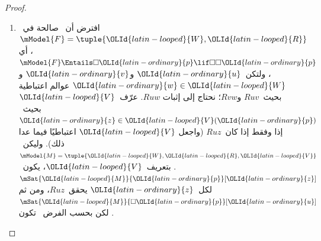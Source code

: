 \documentclass[../../../include/open-logic-section]{subfiles}
\begin{document}
\begin{proof}
\begin{enumerate}
    $\mModel{F}= \tuple{{\OLId{latin-looped}{W}}, {\OLId{latin-looped}{R}}}$. فإذا كان~$\mModel{F}$ غير متناظر،
    وُجد~${\OLId{latin-ordinary}{u}}$ و${\OLId{latin-ordinary}{v}} \in {\OLId{latin-looped}{W}}$ بحيث~$Ruv$ لكن ليس~$Rvu$. عرّف~${\OLId{latin-looped}{V}}$ بحيث
    ${\OLId{latin-ordinary}{w}} \in {\OLId{latin-looped}{V}}({\OLId{latin-ordinary}{p}})$ إذا وفقط إذا لم يكن~$Rvw$ (واجعل~${\OLId{latin-looped}{V}}$ اعتباطيًا فيما
    عدا ذلك). وليكن~$\mModel{M} =\tuple{{\OLId{latin-looped}{W}}, {\OLId{latin-looped}{R}}, {\OLId{latin-looped}{V}}}$. الآن، بتعريف~${\OLId{latin-looped}{V}}$،
    يكون~$\mSat{{\OLId{latin-looped}{M}}}{{\OLId{latin-ordinary}{p}}}[{\OLId{latin-ordinary}{w}}]$ لكل~${\OLId{latin-ordinary}{w}}$ لا يحقق~$Rvw$، وبخاصة
    $\mSat{{\OLId{latin-looped}{M}}}{{\OLId{latin-ordinary}{p}}}[{\OLId{latin-ordinary}{u}}]$ لأن~$Rvu$ لا يصدق. كذلك، لما كان~$Rvw$ إذا وفقط
    إذا كان~${\OLId{latin-ordinary}{w}} \notin {\OLId{latin-looped}{V}}({\OLId{latin-ordinary}{p}})$، فلا يوجد~${\OLId{latin-ordinary}{w}}$ يحقق~$Rvw$ و
    $\mSat{{\OLId{latin-looped}{M}}}{{\OLId{latin-ordinary}{p}}}[{\OLId{latin-ordinary}{w}}]$ معًا، ومن ثم~$\mSat/{{\OLId{latin-looped}{M}}}{\Diamond {\OLId{latin-ordinary}{p}}}[{\OLId{latin-ordinary}{v}}]$. ولما
    كان~$Ruv$، كان أيضًا~$\mSat/{{\OLId{latin-looped}{M}}}{\Box\Diamond {\OLId{latin-ordinary}{p}}}[{\OLId{latin-ordinary}{u}}]$. فيلزم
    $\mSat/{{\OLId{latin-looped}{M}}}{{\OLId{latin-ordinary}{p}} \lif \Box\Diamond {\OLId{latin-ordinary}{p}}}[{\OLId{latin-ordinary}{u}}]$، ومن ثم لا تكون~
    صالحة في~$\mModel{F}$.
  \item افترض أن~ صالحة في~$\mModel{F} = \tuple{{\OLId{latin-looped}{W}},{\OLId{latin-looped}{R}}}$، أي
    $\mModel{F} \Entails \Box {\OLId{latin-ordinary}{p}} \lif \Box\Box {\OLId{latin-ordinary}{p}}$، ولتكن~${\OLId{latin-ordinary}{u}}$ و${\OLId{latin-ordinary}{v}}$
    و${\OLId{latin-ordinary}{w}} \in {\OLId{latin-looped}{W}}$ عوالم اعتباطية بحيث~$Ruv$ و$Rvw$؛ نحتاج إلى إثبات
    $Ruw$. عرّف~${\OLId{latin-looped}{V}}$ بحيث~${\OLId{latin-ordinary}{z}} \in {\OLId{latin-looped}{V}}({\OLId{latin-ordinary}{p}})$ إذا وفقط إذا كان~$Ruz$ (واجعل
    ${\OLId{latin-looped}{V}}$ اعتباطيًا فيما عدا ذلك). وليكن~$\mModel{M} =\tuple{{\OLId{latin-looped}{W}}, {\OLId{latin-looped}{R}}, {\OLId{latin-looped}{V}}}$.
    بتعريف~${\OLId{latin-looped}{V}}$، يكون~$\mSat{{\OLId{latin-looped}{M}}}{{\OLId{latin-ordinary}{p}}}[{\OLId{latin-ordinary}{z}}]$ لكل~${\OLId{latin-ordinary}{z}}$ يحقق~$Ruz$، ومن ثم
    $\mSat{{\OLId{latin-looped}{M}}}{\Box {\OLId{latin-ordinary}{p}}}[{\OLId{latin-ordinary}{u}}]$. لكن بحسب الفرض~ تكون

\end{enumerate}
\end{proof}
\end{document}
